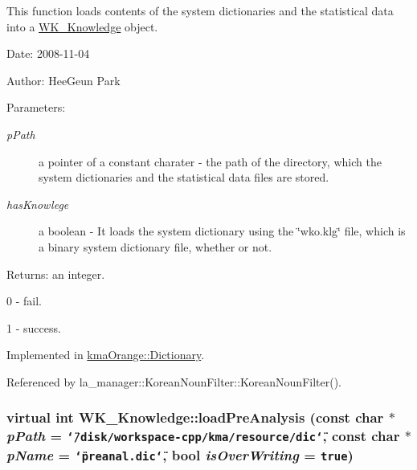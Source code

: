 This function loads contents of the system dictionaries and the statistical data into a \hyperlink{classWK__Knowledge}{WK\_\-Knowledge} object. 

\begin{Desc}
\item[Date:]2008-11-04 \end{Desc}
\begin{Desc}
\item[Author:]HeeGeun Park \end{Desc}
\begin{Desc}
\item[Parameters:]
\begin{description}
\item[{\em pPath}]a pointer of a constant charater - the path of the directory, which the system dictionaries and the statistical data files are stored. \item[{\em hasKnowlege}]a boolean - It loads the system dictionary using the \char`\"{}wko.klg\char`\"{} file, which is a binary system dictionary file, whether or not. \end{description}
\end{Desc}
\begin{Desc}
\item[Returns:]an integer.\par
 0 - fail.\par
 1 - success. \end{Desc}


Implemented in \hyperlink{classkmaOrange_1_1Dictionary_22a1dd6af0f8698ff758de165ba5b613}{kmaOrange::Dictionary}.

Referenced by la\_\-manager::KoreanNounFilter::KoreanNounFilter().\hypertarget{classWK__Knowledge_9c8847731efad49fa0e4385325e2d4b7}{
\subsubsection[{loadPreAnalysis}]{\setlength{\rightskip}{0pt plus 5cm}virtual int WK\_\-Knowledge::loadPreAnalysis (const char $\ast$ {\em pPath} = {\tt \char`\"{}/disk/workspace-cpp/kma/resource/dic\char`\"{}}, \/  const char $\ast$ {\em pName} = {\tt \char`\"{}preanal.dic\char`\"{}}, \/  bool {\em isOverWriting} = {\tt true})}}
\label{classWK__Knowledge_9c8847731efad49fa0e4385325e2d4b7}


